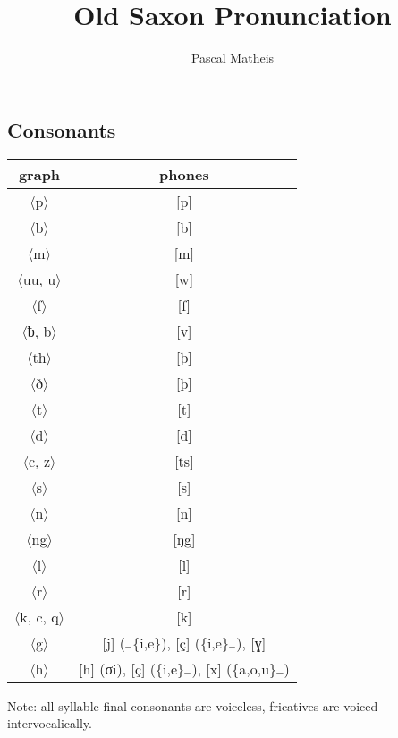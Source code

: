 \documentclass[11pt,letterpaper]{article}
\title{Old Saxon Pronunciation}
\author{Pascal Matheis}
\date{}
\def\grph#1{$\langle$#1$\rangle$}
\begin{document}
\maketitle
\thispagestyle{empty}

\begin{multicols}{2}
\section*{Consonants}

\begin{tabular}{c c}
\toprule
graph & phones \\ \midrule
\grph{p} & [p] \\
\grph{b} & [b] \\
\grph{m} & [m] \\
\grph{uu, u} & [w] \\
\grph{f} & [f] \\
\grph{{\phfont ƀ}, b} & [v] \\
\grph{th} & [þ] \\
\grph{ð} & [þ] \\
\grph{t} & [t] \\
\grph{d} & [d] \\
\grph{c, z} & [ts] \\
\grph{s} & [s] \\
\grph{n} & [n] \\
\grph{ng} & [ŋg] \\
\grph{l} & [l] \\
\grph{r} & [r] \\
\grph{k, c, q} & [k] \\
\grph{g} & [j] ($\rule{0.5em}{0.5pt}$\{i,e\}), [ç] (\{i,e\}$\rule{0.5em}{0.5pt}$), [{\phfont ɣ}] \\
\grph{h} & [h] ({\sc σi}), [ç] (\{i,e\}$\rule{0.5em}{0.5pt}$), [x] (\{a,o,u\}$\rule{0.5em}{0.5pt}$) \\
\bottomrule
\end{tabular}
Note: all syllable-final consonants are voiceless, fricatives are voiced intervocalically.


\end{multicols}
\end{document}
